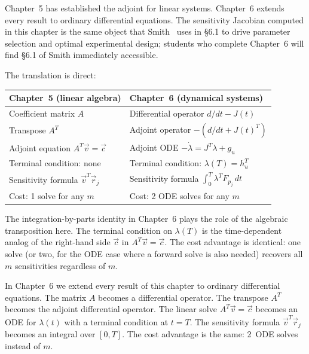 Chapter~5 has established the adjoint for linear systems.
Chapter~6 extends every result to ordinary differential equations.
The sensitivity Jacobian computed in this chapter is the same object
that Smith~\cite{smith2014uncertainty} uses in \S6.1 to drive
parameter selection and optimal experimental design; students who
complete Chapter~6 will find \S6.1 of Smith immediately accessible.

The translation is direct:

\begin{center}
\renewcommand{\arraystretch}{1.5}
\begin{tabular}{ll}
\toprule
Chapter~5 (linear algebra) & Chapter~6 (dynamical systems) \\
\midrule
Coefficient matrix $A$ & Differential operator $d/dt - J(t)$ \\
Transpose $A^T$ & Adjoint operator $-(d/dt + J(t)^T)$ \\
Adjoint equation $A^T\vec{v} = \vec{c}$ &
  Adjoint ODE $-\dot{\lambda} = J^T\lambda + g_u$ \\
Terminal condition: none & Terminal condition: $\lambda(T) = h_u^T$ \\
Sensitivity formula $\vec{v}^T\vec{r}_j$ &
  Sensitivity formula $\int_0^T\lambda^T F_{p_j}\,dt$ \\
Cost: 1 solve for any $m$ & Cost: 2 ODE solves for any $m$ \\
\bottomrule
\end{tabular}
\end{center}

The integration-by-parts identity in Chapter~6 plays the role of
the algebraic transposition here. The terminal condition on $\lambda(T)$
is the time-dependent analog of the right-hand side $\vec{c}$ in
$A^T\vec{v} = \vec{c}$. The cost advantage is identical: one solve
(or two, for the ODE case where a forward solve is also needed)
recovers all $m$ sensitivities regardless of $m$.

\medskip
In Chapter~6 we extend every result of this chapter to ordinary
differential equations.
The matrix $A$ becomes a differential operator.
The transpose $A^T$ becomes the adjoint differential operator.
The linear solve $A^T\vec{v} = \vec{c}$ becomes an ODE for
$\lambda(t)$ with a terminal condition at $t = T$.
The sensitivity formula $\vec{v}^T\vec{r}_j$ becomes an integral
over $[0,T]$.
The cost advantage is the same: 2~ODE solves instead of $m$.
\medskip

